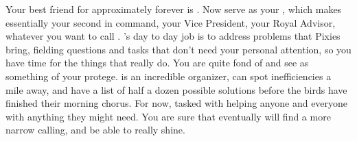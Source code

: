 \documentclass[char]{PP}
\begin{document}
\begin{contacts}
	\contact{\cSAdvisor{}} Your best friend for approximately forever is \cSAdvisor{}. Now \cSAdvisor{\They} serve\cSAdvisor{\plural} as your \cSAdvisor{\Heir}, which makes \cSAdvisor{\them} essentially your second in command, your Vice President, your Royal Advisor, whatever you want to call \cSAdvisor{\them}. \cSAdvisor{}'s day to day job is to address problems that Pixies bring, fielding questions and tasks that don't need your personal attention, so you have time for the things that really do.
	\contact{\cSHelp{}} You are quite fond of \cSHelp{} and see \cSHelp{\them} as something of your protege. \cSHelp{} is an incredible organizer, can spot inefficiencies a mile away, and have a list of half a dozen possible solutions before the birds have finished their morning chorus. For now, \cSHelp{\Theyare} tasked with helping anyone and everyone with anything they might need. You are sure that eventually \cSHelp{} will find a more narrow calling, and be able to really shine.
\end{contacts}
\end{document}
